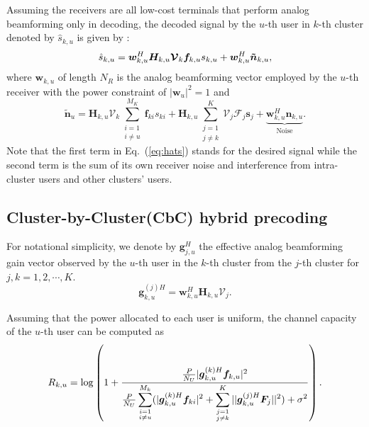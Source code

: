 \documentclass[conference]{IEEEtran}
\begin{document}
{Assuming the receivers are all low-cost terminals that perform analog beamforming only in decoding, the decoded signal by the $u$-th user in $k$-th cluster denoted by $\hat{s}_{k,u}$ is given by :
\begin{equation}{\label{eq:hats}}
\hat{s}_{k,u} = \bm{w}_{k,u}^H \bm{H}_{k,u} \bm{\mathcal{V}}_k \bm{f}_{k,u} s_{k,u} + \bm{w}_{k,u}^H \bm{\tilde{n}}_{k,u},
\end{equation}
where ${\bm w}_{k,u}$ of length $N_R$ is the analog beamforming vector employed by the $u$-th receiver with the power constraint of $|\bm{w}_u|^2=1$ and
\begin{equation}\label{Eq:ntilde}
\bm{\tilde{n}}_u=\bm{H}_{k,u} \bm{\mathcal{V}}_k\sum_{\substack{i=1 \\ i\neq u}}^{M_K}\bm{f}_{ki}s_{ki} + \bm{H}_{k,u}\sum_{\substack{j=1\\j\neq k}}^{K}\bm{\mathcal{V}}_j\bm{\mathcal{F}}_j\bm{s}_j+  \underbrace{\bm{w}_{k,u}^H \bm{n}_{k,u}}_\text{Noise}.
\end{equation}
Note that the first term in Eq.~(\ref{eq:hats}) stands for the desired signal while the second term is the sum of its own receiver noise and interference from intra-cluster users and other clusters' users.

\subsection{Cluster-by-Cluster(CbC) hybrid precoding}
For notational simplicity, we denote by ${\bm{g}}_{j,u}^H$ the effective analog beamforming gain vector observed by the $u$-th user in the $k$-th cluster from the $j$-th cluster for $j,k=1,2,\cdots,K$.
\begin{equation}\label{eq:def}
{\bm{g}}^{(j)H}_{k,u} = \bm{w}^H_{k,u} \bm{H}_{k,u} \bm{\mathcal{V}}_{j}.
\end{equation}

Assuming that the power allocated to each user is uniform, the channel capacity of the $u$-th user can be computed as
\begin{equation}\small\label{eq:convenR}
R_{k,u} = \log\left(1+\frac{\frac{P}{N_U}|{\bm{g}}_{k,u}^{(k)H} \bm{f}_{k,u}|^2}{\frac{P}{N_U}\displaystyle\sum_{\substack{i=1 \\ i\neq u}}^{M_k}(|{\bm{g}}_{k,u}^{(k)H}\bm{f}_{ki}|^2+\displaystyle\sum_{\substack{j=1\\j\neq k}}^{K}||\bm{g}_{k,u}^{(j)H}\bm{F}_j||^2)+\sigma^2}\right).
\end{equation}

}
\end{document}
